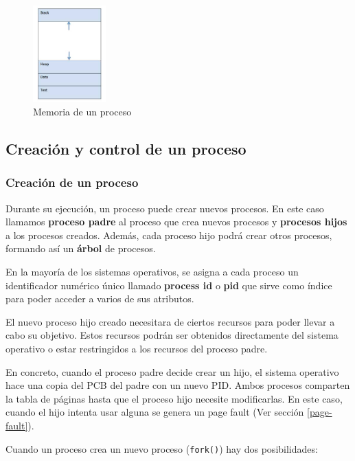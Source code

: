 \begin{figure}
    \begin{center}
        \includegraphics[width=0.25\textwidth]{imagenes/process_components.jpg}	
    \end{center}
    
    \caption*{Memoria de un proceso}
    \end{figure}

\subsection{Creación y control de un proceso}
\subsubsection{Creación de un proceso}

Durante su ejecución, un proceso puede crear nuevos procesos. En este caso llamamos \textbf{proceso padre} al proceso que crea nuevos procesos y \textbf{procesos hijos} a los procesos creados. Además, cada proceso hijo podrá crear otros procesos, formando así un \textbf{árbol} de procesos.

En la mayoría de los sistemas operativos, se asigna a cada proceso un identificador numérico único llamado \textbf{process id} o \textbf{pid} que sirve como índice para poder acceder a varios de sus atributos.

El nuevo proceso hijo creado necesitara de ciertos recursos para poder llevar a cabo su objetivo. Estos recursos podrán ser obtenidos directamente del sistema operativo o estar restringidos a los recursos del proceso padre.

En concreto, cuando el proceso padre decide crear un hijo, el sistema operativo hace una copia del PCB del padre con un nuevo PID. Ambos procesos comparten la tabla de páginas hasta que el proceso hijo necesite modificarlas. En este caso, cuando el hijo intenta usar alguna se genera un page fault (Ver sección \ref{page-fault}).

Cuando un proceso crea un nuevo proceso (\texttt{fork()}) hay dos posibilidades:

